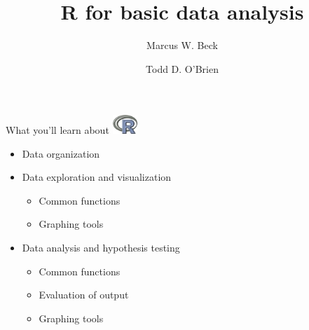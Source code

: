 \documentclass[xcolor=svgnames]{beamer}\usepackage[]{graphicx}\usepackage[]{color}
\begin{document}
\title[R for basic data analysis]{R for basic data analysis}

\author[M. Beck, T. O'Brien]{Marcus W. Beck \and Todd D. O'Brien}

\date{}



\begin{frame}{What you'll learn about \hspace{0.2em}\includegraphics[width=0.07\textwidth]{Rlogo.jpg}}
\begin{itemize}
\itemsep20pt
\item Data organization
\item Data exploration and visualization
\begin{itemize}
\item Common functions
\item Graphing tools
\end{itemize}
\item Data analysis and hypothesis testing
\begin{itemize}
\item Common functions
\item Evaluation of output 
\item Graphing tools \\~\\
\end{itemize}
\end{itemize}
\end{frame}
\end{document}
